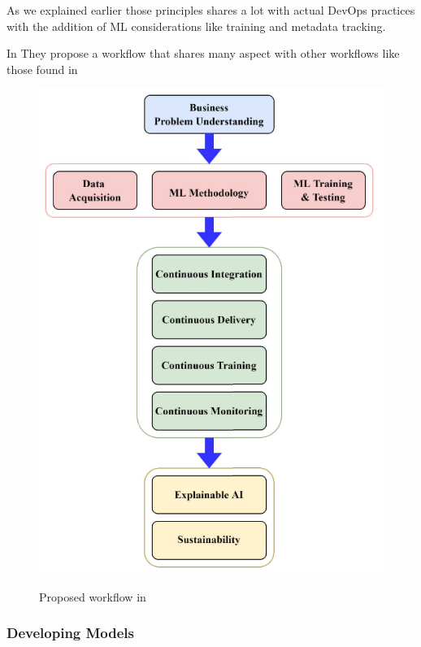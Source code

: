 As we explained earlier those principles shares a lot with actual DevOps practices with the addition of ML considerations
like training and metadata tracking.

In\cite{9792270} They propose a workflow that shares many aspect with other workflows like those found in\cite{treveil2020introducing,gift2021practical}

\begin{figure}[!htbp]
    \caption{Proposed workflow in\cite{9792270}}
    \centering
    \includegraphics[scale=0.5]{images/taxo-workflow}
    \label{fig:taxo-workflow}
\end{figure}


\subsubsection{Developing Models}

